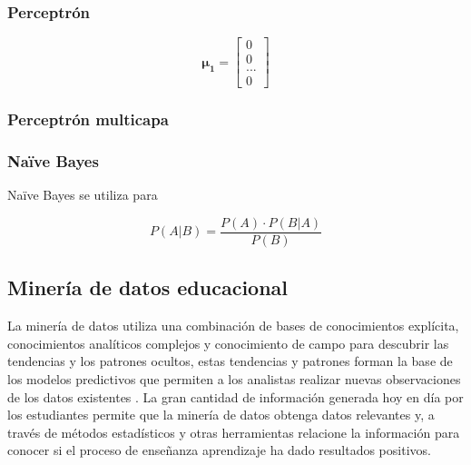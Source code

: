 \begin{figure}[H]
	\centering
	
	\label{fig:svm}
\end{figure}

\subsubsection*{Perceptrón}

\begin{figure}[H]
	\centering
	
	\label{fig:perceptron}
\end{figure}

\begin{equation}
 \pmb{\mu_1} = \begin{bmatrix}0\\0\\...\\0\end{bmatrix}
\end{equation}

\subsubsection*{Perceptrón multicapa}

\begin{figure}[H]
	\centering
	
	\label{fig:multilayer-perceptron}
\end{figure}

\subsubsection*{Na\"ive Bayes}

Na\"ive Bayes se utiliza para

\begin{equation}
 P(A|B) = \frac{P(A) \cdot P(B|A)}{P(B)}
 \label{eq:naive-bayes}
\end{equation}


\subsection{Minería de datos educacional}
La minería de datos utiliza una combinación de bases de conocimientos explícita, conocimientos analíticos complejos y conocimiento de campo para descubrir las tendencias y los patrones ocultos, estas tendencias y patrones forman la base de los modelos predictivos que permiten a los analistas realizar nuevas observaciones de los datos existentes \parencite{luan2002data}. La gran cantidad de información generada hoy en día por los estudiantes permite que la minería de datos obtenga datos relevantes y, a través de métodos estadísticos y otras herramientas relacione la información para conocer si el proceso de enseñanza aprendizaje ha dado resultados positivos. 

